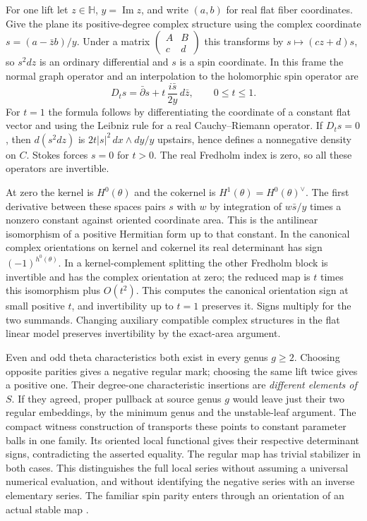 For one lift let \(z\in\mathbb H\), \(y=\operatorname{Im} z\), and write \((a,b)\) for real flat fiber coordinates. Give the plane its positive-degree complex structure using the complex coordinate \(s=(a-\bar z b)/y\). Under a matrix \(\left(\begin{smallmatrix}A&B\\c&d\end{smallmatrix}\right)\) this transforms by \(s\mapsto(cz+d)s\), so \(s^2dz\) is an ordinary differential and \(s\) is a spin coordinate. In this frame the normal graph operator and an interpolation to the holomorphic spin operator are
\[D_t s=\bar\partial s+ t\,\frac{i\bar s}{2y}\,d\bar z,
                           \qquad 0\le t\le1 .\]
For \(t=1\) the formula follows by differentiating the coordinate of a constant flat vector and using the Leibniz rule for a real Cauchy--Riemann operator. If \(D_t s=0\), then \(d(s^2dz)\) is \(2t|s|^2\,dx\wedge dy/y\) upstairs, hence defines a nonnegative density on \(C\). Stokes forces \(s=0\) for \(t>0\). The real Fredholm index is zero, so all these operators are invertible.

At zero the kernel is \(H^0(\theta)\) and the cokernel is \(H^1(\theta)=H^0(\theta)^\vee\). The first derivative between these spaces pairs \(s\) with \(w\) by integration of \(w\bar s/y\) times a nonzero constant against oriented coordinate area. This is the antilinear isomorphism of a positive Hermitian form up to that constant. In the canonical complex orientations on kernel and cokernel its real determinant has sign \((-1)^{h^0(\theta)}\). In a kernel-complement splitting the other Fredholm block is invertible and has the complex orientation at zero; the reduced map is \(t\) times this isomorphism plus \(O(t^2)\). This computes the canonical orientation sign at small positive \(t\), and invertibility up to \(t=1\) preserves it. Signs multiply for the two summands. Changing auxiliary compatible complex structures in the flat linear model preserves invertibility by the exact-area argument.

Even and odd theta characteristics both exist in every genus \(g\ge2\). Choosing opposite parities gives a negative regular mark; choosing the same lift twice gives a positive one. Their degree-one characteristic insertions are \emph{different elements of \(S\)}. If they agreed, proper pullback at source genus \(g\) would leave just their two regular embeddings, by the minimum genus and the unstable-leaf argument. The compact witness construction of \cite{WueProduct} transports these points to constant parameter balls in one family. Its oriented local functional gives their respective determinant signs, contradicting the asserted equality. The regular map has trivial stabilizer in both cases. This distinguishes the full local series without assuming a universal numerical evaluation, and without identifying the negative series with an inverse elementary series. The familiar spin parity enters through an orientation of an actual stable map \cite{WueProduct} \cite{atiyah}.

